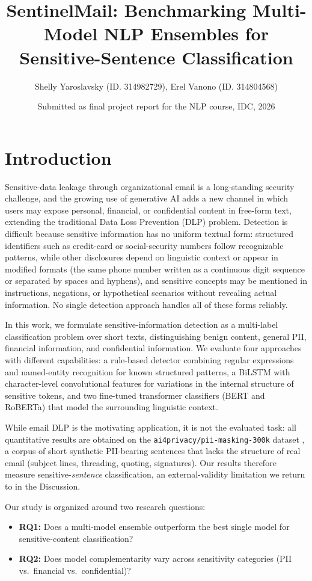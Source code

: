 \documentclass{article}
\title{SentinelMail: Benchmarking Multi-Model NLP Ensembles for Sensitive-Sentence Classification}
\author{Shelly Yaroslavsky (ID. 314982729), Erel Vanono (ID. 314804568)}
\date{Submitted as final project report for the NLP course, IDC, 2026}
\begin{document}
\maketitle

\section{Introduction}

Sensitive-data leakage through organizational email is a long-standing
security challenge, and the growing use of generative AI adds a new
channel in which users may expose personal, financial, or confidential
content in free-form text, extending the traditional Data Loss
Prevention (DLP) problem. Detection is difficult because sensitive
information has no uniform textual form: structured identifiers such as
credit-card or social-security numbers follow recognizable patterns,
while other disclosures depend on linguistic context or appear in
modified formats (the same phone number written as a continuous digit
sequence or separated by spaces and hyphens), and sensitive concepts
may be mentioned in instructions, negations, or hypothetical scenarios
without revealing actual information. No single detection approach
handles all of these forms reliably.

In this work, we formulate sensitive-information detection as a
multi-label classification problem over short texts, distinguishing
benign content, general PII, financial information, and confidential
information. We evaluate four approaches with different capabilities: a
rule-based detector combining regular expressions and named-entity
recognition for known structured patterns, a BiLSTM with
character-level convolutional features for variations in the internal
structure of sensitive tokens, and two fine-tuned transformer
classifiers (BERT and RoBERTa) that model the surrounding linguistic
context.

While email DLP is the motivating application, it is not the evaluated
task: all quantitative results are obtained on the
\texttt{ai4privacy/pii-masking-300k} dataset \citep{ai4privacy2024}, a
corpus of short synthetic PII-bearing sentences that lacks the
structure of real email (subject lines, threading, quoting,
signatures). Our results therefore measure sensitive-\emph{sentence}
classification, an external-validity limitation we return to in the
Discussion.

Our study is organized around two research questions:

\begin{itemize}
    \item \textbf{RQ1:} Does a multi-model ensemble outperform the best
    single model for sensitive-content classification?
    \item \textbf{RQ2:} Does model complementarity vary across
    sensitivity categories (PII vs.\ financial vs.\ confidential)?
\end{itemize}
\end{document}
